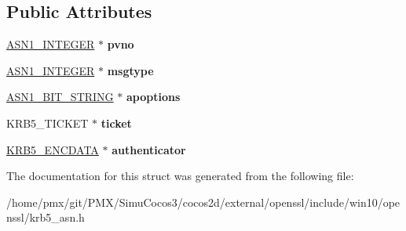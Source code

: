 \subsection*{Public Attributes}
\begin{DoxyCompactItemize}
\item 
\mbox{\label{structkrb5__ap__req__st_ad7f61cf7b1d536b06dde3c71776c118f}} 
\hyperlink{structasn1__string__st}{A\+S\+N1\+\_\+\+I\+N\+T\+E\+G\+ER} $\ast$ {\bfseries pvno}
\item 
\mbox{\label{structkrb5__ap__req__st_a95993daaa70c2d6dc49746ea6867f790}} 
\hyperlink{structasn1__string__st}{A\+S\+N1\+\_\+\+I\+N\+T\+E\+G\+ER} $\ast$ {\bfseries msgtype}
\item 
\mbox{\label{structkrb5__ap__req__st_ae43d1ed55bdd32998d4fab8918f62d6b}} 
\hyperlink{structasn1__string__st}{A\+S\+N1\+\_\+\+B\+I\+T\+\_\+\+S\+T\+R\+I\+NG} $\ast$ {\bfseries apoptions}
\item 
\mbox{\label{structkrb5__ap__req__st_a9f842653f3c353af99fdd723151d26a4}} 
K\+R\+B5\+\_\+\+T\+I\+C\+K\+ET $\ast$ {\bfseries ticket}
\item 
\mbox{\label{structkrb5__ap__req__st_aa3f69c831c3e59add2c118ce00b974e9}} 
\hyperlink{structkrb5__encdata__st}{K\+R\+B5\+\_\+\+E\+N\+C\+D\+A\+TA} $\ast$ {\bfseries authenticator}
\end{DoxyCompactItemize}


The documentation for this struct was generated from the following file\+:\begin{DoxyCompactItemize}
\item 
/home/pmx/git/\+P\+M\+X/\+Simu\+Cocos3/cocos2d/external/openssl/include/win10/openssl/krb5\+\_\+asn.\+h\end{DoxyCompactItemize}
